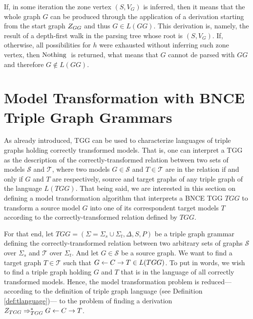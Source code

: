 \documentclass[]{report}
\begin{document}
If, in some iteration the zone vertex $(S, V_G)$ is inferred, then it means that the whole graph $G$ can be produced through the application of a derivation starting from the start graph $Z_{GG}$ and thus $G \in L(GG)$. This derivation is, namely, the result of a depth-first walk in the parsing tree whose root is $(S, V_G)$. If, otherwise, all possibilities for $h$ were exhausted without inferring such zone vertex, then $\operatorname{\text{Nothing}}\;$ is returned, what means that $G$ cannot de parsed with $GG$ and therefore $G \notin L(GG)$.





\section{Model Transformation with BNCE Triple Graph Grammars}
As already introduced, TGG can be used to characterize languages of triple graphs holding correctly transformed models. That is, one can interpret a TGG as the description of the correctly-transformed relation between two sets of models $\mathcal{S}$ and $\mathcal{T}$, where two models $G \in \mathcal{S}$ and $T \in \mathcal{T}$ are in the relation if and only if $G$ and $T$ are respectively, source and target graphs of any triple graph of the language $L(TGG)$. That being said, we are interested in this section on defining a model transformation algorithm that interprets a BNCE TGG $TGG$ to transform a source model $G$ into one of its correspondent target models $T$ according to the correctly-transformed relation defined by $TGG$.

For that end, let $TGG = (\Sigma = \Sigma_s \cup \Sigma_t, \Delta, S, P)$ be a triple graph grammar defining the correctly-transformed relation between two arbitrary sets of graphs $\mathcal{S}$ over $\Sigma_s$ and $\mathcal{T}$ over $\Sigma_t$. And let $G \in \mathcal{S}$ be a source graph. We want to find a target graph $T \in \mathcal{T}$ such that $G \overset{}{\leftarrow} C \overset{}{\rightarrow} T \in L(TGG)$. To put in words, we wish to find a triple graph holding $G$ and $T$ that is in the language of all correctly transformed models. Hence, the model transformation problem is reduced--- according to the definition of triple graph language (see Definition \ref{def:tlanguage})--- to the problem of finding a derivation $Z_{TGG} \Rightarrow^*_{TGG} G \overset{}{\leftarrow} C \overset{}{\rightarrow} T$.
\end{document}
